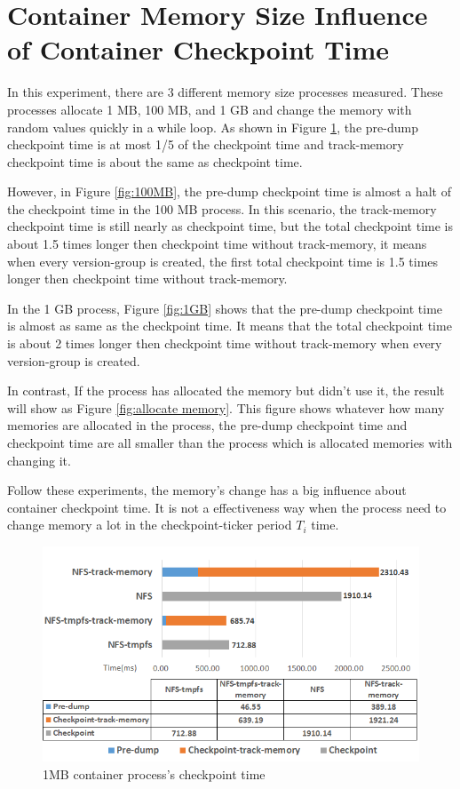 \section{Container Memory Size Influence of Container Checkpoint Time}
In this experiment, there are 3 different memory size processes measured. These processes allocate 1 MB, 100 MB, and 1 GB and change the memory with random values quickly in a while loop.
As shown in Figure \ref{fig:1MB}, the pre-dump checkpoint time is at most 1/5 of the checkpoint time and track-memory checkpoint time is about the same as checkpoint time.

However, in Figure \ref{fig:100MB}, the pre-dump checkpoint time is almost a halt of the checkpoint time in the 100 MB process.
In this scenario, the track-memory checkpoint time is still nearly as checkpoint time, but the total checkpoint time is about 1.5 times longer then checkpoint time without track-memory, it means when every version-group is created, the first total checkpoint time is 1.5 times longer then checkpoint time without track-memory.

In the 1 GB process, Figure \ref{fig:1GB} shows that the pre-dump checkpoint time is almost as same as the checkpoint time. It means that the total checkpoint time is about 2 times longer then checkpoint time without track-memory when every version-group is created. 

In contrast, If the process has allocated the memory but didn't use it, the result will show as Figure \ref{fig:allocate memory}. This figure shows whatever how many memories are allocated in the process, the pre-dump checkpoint time and checkpoint time are all smaller than the process which is allocated memories with changing it.

Follow these experiments, the memory's change has a big influence about container checkpoint time. It is not a effectiveness way when the process need to change memory a lot in the checkpoint-ticker period $ T_i $ time.

\begin{figure}[hbtp]
\begin{center}
\includegraphics[width=14cm]{figure/1MB.png}
\end{center}
\caption{1MB container process's checkpoint time}
\label{fig:1MB}
\end{figure}

